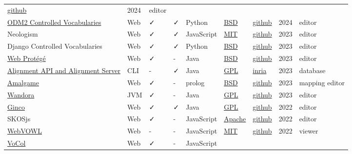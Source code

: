 \documentclass[
  DIV=10]{article}
\begin{document}
\begin{longtable}[]{@{}lllllllll@{}}
\href{https://github.com/acdh-oeaw/vocabseditor}{github} & 2024 &
editor \\
\href{http://vocabulary.odm2.org/}{ODM2 Controlled Vocabularies} & Web &
✓ & ✓ & Python & \href{https://spdx.org/licenses/BSD-3-Clause}{BSD} &
\href{https://github.com/ODM2/ODM2ControlledVocabularies}{github} & 2024
& editor \\
Neologism & Web & ✓ & ✓ & JavaScript &
\href{https://spdx.org/licenses/MIT}{MIT} &
\href{https://github.com/Semantic-Society/Neologism}{github} & 2023 &
editor \\
Django Controlled Vocabularies & Web & ✓ & ✓ & Python &
\href{https://spdx.org/licenses/BSD-3-Clause}{BSD} &
\href{https://github.com/unt-libraries/django-controlled-vocabularies}{github}
& 2023 & editor \\
\href{https://protegewiki.stanford.edu/wiki/WebProtege}{Web Protégé} &
Web & ✓ & - & Java & \href{https://spdx.org/licenses/BSD-3-Clause}{BSD}
& \href{https://github.com/protegeproject/webprotege}{github} & 2023 &
editor \\
\href{https://moex.gitlabpages.inria.fr/alignapi/}{Alignment API and
Alignment Server} & CLI & - & ✓ & Java &
\href{https://spdx.org/licenses/GPL-3.0-or-later}{GPL} &
\href{https://gitlab.inria.fr/moex/alignapi/}{inria} & 2023 &
database \\
\href{https://semanticweb.cs.vu.nl/amalgame/}{Amalgame} & Web & ✓ & - &
prolog & \href{https://spdx.org/licenses/BSD-3-Clause}{BSD} &
\href{https://github.com/jrvosse/amalgame}{github} & 2023 & mapping
editor \\
\href{http://wandora.org/www/}{Wandora} & JVM & ✓ & - & Java &
\href{https://spdx.org/licenses/GPL-3.0-or-later}{GPL} &
\href{https://github.com/wandora-team/wandora}{github} & 2023 &
editor \\
\href{http://culturecommunication.github.io/ginco/}{Ginco} & Web & ✓ & ✓
& Java & \href{https://spdx.org/licenses/GPL-3.0-or-later}{GPL} &
\href{https://github.com/culturecommunication/ginco}{github} & 2022 &
editor \\
SKOSjs & Web & ✓ & - & JavaScript &
\href{https://spdx.org/licenses/Apache-2.0}{Apache} &
\href{https://github.com/tkurz/skosjs}{github} & 2022 & editor \\
\href{https://service.tib.eu/webvowl/}{WebVOWL} & Web & - & - &
JavaScript & \href{https://spdx.org/licenses/MIT}{MIT} &
\href{https://github.com/VisualDataWeb/WebVOWL}{github} & 2022 &
viewer \\
\href{https://www.vocoreg.com/}{VoCol} & Web & ✓ & - & JavaScript &

\end{longtable}
\end{document}
